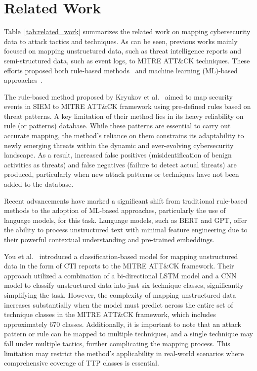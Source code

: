 \section{\label{sec:related}Related Work}

Table~\ref{tab:related_work} summarizes the related work on mapping cybersecurity data to attack tactics and techniques.
As can be seen, previous works mainly focused on mapping unstructured data, such as threat intelligence reports and semi-structured data, such as event logs, to MITRE ATT\&CK techniques. 
These efforts proposed both rule-based methods~\cite{kryukov2022mapping} and machine learning (ML)-based approaches~\cite{alam2023looking,alves2022leveraging,fayyazi2023advancing,rani2024ttpxhunter,you2022tim,liu2022threat,fengrui2024few,zhang2024attackgboosting}.

The rule-based method proposed by Kryukov et al.~\cite{kryukov2022mapping} aimed to map security events in SIEM to MITRE ATT\&CK framework using pre-defined rules based on threat patterns.
A key limitation of their method lies in its heavy reliability on rule (or patterns) database. 
While these patterns are essential to carry out accurate mapping, the method's reliance on them constrains its adaptability to newly emerging threats within the dynamic and ever-evolving cybersecurity landscape.
As a result, increased false positives (misidentification of benign activities as threats) and false negatives (failure to detect actual threats) are produced, particularly when new attack patterns or techniques have not been added to the database.

Recent advancements have marked a significant shift from traditional rule-based methods to the adoption of ML-based approaches, particularly the use of language models, for this task.
Language models, such as BERT and GPT, offer the ability to process unstructured text with minimal feature engineering due to their powerful contextual understanding and pre-trained embeddings. 


You et al.~\cite{you2022tim} introduced a classification-based model for mapping unstructured data in the form of CTI reports to the MITRE ATT\&CK framework. 
Their approach utilized a combination of a bi-directional LSTM model and a CNN model to classify unstructured data into just six technique classes, significantly simplifying the task. 
However, the complexity of mapping unstructured data increases substantially when the model must predict across the entire set of technique classes in the MITRE ATT\&CK framework, which includes approximately 670 classes. 
Additionally, it is important to note that an attack pattern or rule can be mapped to multiple techniques, and a single technique may fall under multiple tactics, further complicating the mapping process.
This limitation may restrict the method’s applicability in real-world scenarios where comprehensive coverage of TTP classes is essential.

